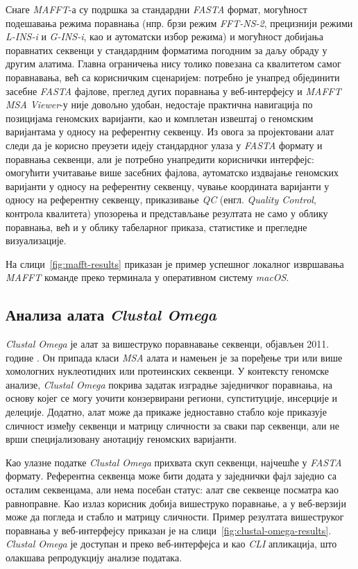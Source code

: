 \documentclass[12pt,oneside]{memoir}
\begin{document}
Снаге \textit{MAFFT}-а су подршка за стандардни \textit{FASTA} формат,  могућност подешавања режима поравнања (нпр. брзи режим \textit{FFT-NS-2}, прецизнији режими \textit{L-INS-i} и \textit{G-INS-i}, као и аутоматски избор режима) и могућност добијања поравнатих секвенци у стандардним форматима погодним за даљу обраду у другим алатима. Главна ограничења нису толико повезана са квалитетом самог поравнавања, већ са корисничким сценаријем: потребно је унапред објединити засебне \textit{FASTA} фајлове, преглед дугих поравнања у веб-интерфејсу и \textit{MAFFT} \textit{MSA Viewer}-у није довољно удобан, недостаје практична навигација по позицијама геномских варијанти, као и комплетан извештај о геномским варијантама у односу на референтну секвенцу. Из овога за пројектовани алат следи да је корисно преузети идеју стандардног улаза у \textit{FASTA} формату и поравнања секвенци, али је потребно унапредити кориснички интерфејс: омогућити учитавање више засебних фајлова, аутоматско издвајање геномских варијанти у односу на референтну секвенцу, чување координата варијанти у односу на референтну секвенцу, приказивање \textit{QC} (енгл. \textit{Quality Control}, контрола квалитета) упозорења и представљање резултата не само у облику поравнања, већ и у облику табеларног приказа, статистике и прегледне визуализације.

На слици~\ref{fig:mafft-results} приказан је пример успешног локалног извршавања \textit{MAFFT} команде преко терминала у оперативном систему \textit{macOS}.


\subsection{Анализа алата \textit{Clustal Omega}}
\textit{Clustal Omega} је алат за вишеструко поравнавање секвенци, објављен 2011. године \cite{sievers2011clustalomega}. Он припада класи \textit{MSA} алата и намењен је за поређење три или више хомологних нуклеотидних или протеинских секвенци. У контексту геномске анализе, \textit{Clustal Omega} покрива задатак изградње заједничког поравнања, на основу којег се могу уочити конзервирани региони, супституције, инсерције и делеције. Додатно, алат може да прикаже једноставно стабло које приказује сличност између секвенци и матрицу сличности за сваки пар секвенци, али не врши специјализовану анотацију геномских варијанти.

Као улазне податке \textit{Clustal Omega} прихвата скуп секвенци, најчешће у \textit{FASTA} формату. Референтна секвенца може бити додата у заједнички фајл заједно са осталим секвенцама, али нема посебан статус: алат све секвенце посматра као равноправне. Као излаз корисник добија вишеструко поравнање, а у веб-верзији може да погледа и стабло и матрицу сличности. Пример резултата вишеструког поравнања у веб-интерфејсу приказан је на слици~\ref{fig:clustal-omega-results}. \textit{Clustal Omega} је доступан и преко веб-интерфејса и као \textit{CLI} апликација, што олакшава репродукцију анализе података.
\end{document}
